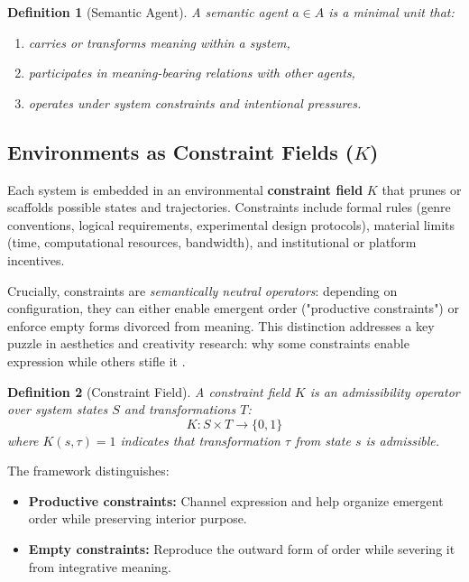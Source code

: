 \documentclass[12pt]{article}
\newtheorem{definition}{Definition}
\begin{document}
\begin{definition}[Semantic Agent]
A semantic agent $a \in A$ is a minimal unit that:
\begin{enumerate}
\item carries or transforms meaning within a system,
\item participates in meaning-bearing relations with other agents,
\item operates under system constraints and intentional pressures.
\end{enumerate}
\end{definition}

\subsection{Environments as Constraint Fields ($K$)}

Each system is embedded in an environmental \textbf{constraint field} $K$ that prunes or scaffolds possible states and trajectories. Constraints include formal rules (genre conventions, logical requirements, experimental design protocols), material limits (time, computational resources, bandwidth), and institutional or platform incentives.

Crucially, constraints are \textit{semantically neutral operators}: depending on configuration, they can either enable emergent order ("productive constraints") or enforce empty forms divorced from meaning. This distinction addresses a key puzzle in aesthetics and creativity research: why some constraints enable expression while others stifle it \citep{stokes2005creativity, elster2000ulysses}.

\begin{definition}[Constraint Field]
A constraint field $K$ is an admissibility operator over system states $S$ and transformations $T$:
\[
K: S \times T \rightarrow \{0, 1\}
\]
where $K(s, \tau) = 1$ indicates that transformation $\tau$ from state $s$ is admissible.
\end{definition}

The framework distinguishes:
\begin{itemize}
\item \textbf{Productive constraints:} Channel expression and help organize emergent order while preserving interior purpose.
\item \textbf{Empty constraints:} Reproduce the outward form of order while severing it from integrative meaning.
\end{itemize}
\end{document}
